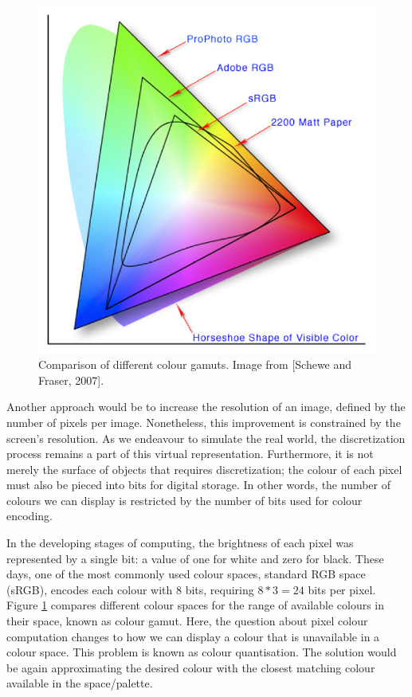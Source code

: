 \begin{figure}
\includegraphics[width=\linewidth]{Images/colourspace.png}
\caption{Comparison of different colour gamuts. Image from [Schewe and Fraser, 2007].}\label{fig:colour-gamut}
    
\end{figure} 

Another approach would be to increase the resolution of an image, defined by the number of pixels per image. Nonetheless, this improvement is constrained by the screen’s resolution. As we endeavour to simulate the real world, the discretization process remains a part of this virtual representation. Furthermore, it is not merely the surface of objects that requires discretization; the colour of each pixel must also be pieced into bits for digital storage. In other words, the number of colours we can display is restricted by the number of bits used for colour encoding. 

In the developing stages of computing, the brightness of each pixel was represented by a single bit: a value of one for white and zero for black. These days, one of the most commonly used colour spaces, standard RGB space (sRGB), encodes each colour with 8 bits, requiring $8 * 3 = 24$ bits per pixel. Figure \ref{fig:colour-gamut} compares different colour spaces for the range of available colours in their space, known as colour gamut. Here, the question about pixel colour computation changes to how we can display a colour that is unavailable in a colour space. This problem is known as colour quantisation. The solution would be again approximating the desired colour with the closest matching colour available in the space/palette.


